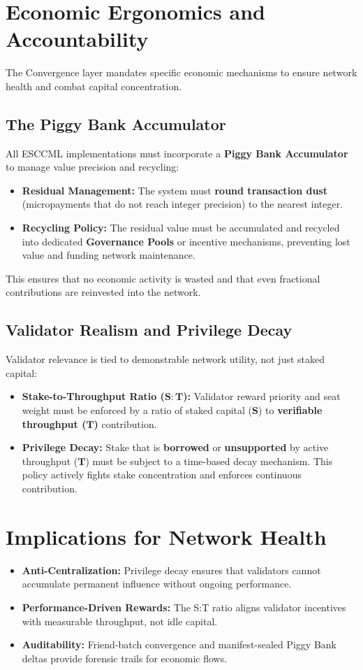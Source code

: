 \documentclass[11pt, a4paper]{article}
\begin{document}
\section{Economic Ergonomics and Accountability}
The Convergence layer mandates specific economic mechanisms to ensure network health and combat capital concentration.

\subsection{The Piggy Bank Accumulator}
All ESCCML implementations must incorporate a \textbf{Piggy Bank Accumulator} to manage value precision and recycling:
\begin{itemize}
    \item \textbf{Residual Management:} The system must \textbf{round transaction dust} (micropayments that do not reach integer precision) to the nearest integer.
    \item \textbf{Recycling Policy:} The residual value must be accumulated and recycled into dedicated \textbf{Governance Pools} or incentive mechanisms, preventing lost value and funding network maintenance.
\end{itemize}
This ensures that no economic activity is wasted and that even fractional contributions are reinvested into the network.

\subsection{Validator Realism and Privilege Decay}
Validator relevance is tied to demonstrable network utility, not just staked capital:
\begin{itemize}
    \item \textbf{Stake-to-Throughput Ratio ($\mathbf{S:T}$):} Validator reward priority and seat weight must be enforced by a ratio of staked capital ($\mathbf{S}$) to \textbf{verifiable throughput ($\mathbf{T}$)} contribution.
    \item \textbf{Privilege Decay:} Stake that is \textbf{borrowed} or \textbf{unsupported} by active throughput ($\mathbf{T}$) must be subject to a time-based decay mechanism. This policy actively fights stake concentration and enforces continuous contribution.
\end{itemize}

\section{Implications for Network Health}
\begin{itemize}
    \item \textbf{Anti-Centralization:} Privilege decay ensures that validators cannot accumulate permanent influence without ongoing performance.
    \item \textbf{Performance-Driven Rewards:} The S:T ratio aligns validator incentives with measurable throughput, not idle capital.
    \item \textbf{Auditability:} Friend-batch convergence and manifest-sealed Piggy Bank deltas provide forensic trails for economic flows.
\end{itemize}
\end{document}
